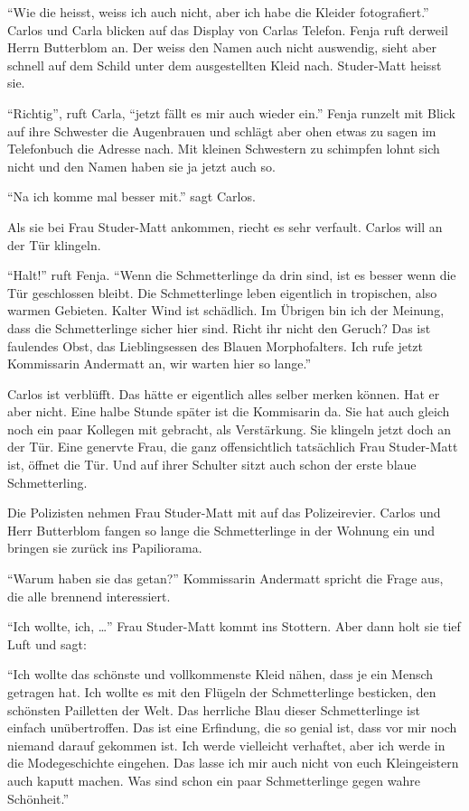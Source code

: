 \enquote{Wie die heisst, weiss ich auch nicht, aber ich habe die Kleider fotografiert.} Carlos und Carla blicken auf das Display von Carlas Telefon. Fenja ruft derweil Herrn Butterblom an. Der weiss den Namen auch nicht auswendig, sieht aber schnell auf dem Schild unter dem ausgestellten Kleid nach. Studer-Matt heisst sie.

\enquote{Richtig}, ruft Carla, \enquote{jetzt fällt es mir auch wieder ein.} Fenja runzelt mit Blick auf ihre Schwester die Augenbrauen und schlägt aber ohen etwas zu sagen im Telefonbuch die Adresse nach. Mit kleinen Schwestern zu schimpfen lohnt sich nicht und den Namen haben sie ja jetzt auch so.

\enquote{Na ich komme mal besser mit.} sagt Carlos.

Als sie bei Frau Studer-Matt ankommen, riecht es sehr verfault. Carlos will an der Tür klingeln.

\enquote{Halt!} ruft Fenja. \enquote{Wenn die Schmetterlinge da drin sind, ist es besser wenn die Tür geschlossen bleibt. Die Schmetterlinge leben eigentlich in tropischen, also warmen Gebieten. Kalter Wind ist schädlich. Im Übrigen bin ich der Meinung, dass die Schmetterlinge sicher hier sind. Richt ihr nicht den Geruch? Das ist faulendes Obst, das Lieblingsessen des Blauen Morphofalters. Ich rufe jetzt Kommissarin Andermatt an, wir warten hier so lange.}

Carlos ist verblüfft. Das hätte er eigentlich alles selber merken können. Hat er aber nicht. Eine halbe Stunde später ist die Kommisarin da. Sie hat auch gleich noch ein paar Kollegen mit gebracht, als Verstärkung. Sie klingeln jetzt doch an der Tür. Eine genervte Frau, die ganz offensichtlich tatsächlich Frau Studer-Matt ist, öffnet die Tür. Und auf ihrer Schulter sitzt auch schon der erste blaue Schmetterling.
\begin{center}
\aldineleft
\end{center}

Die Polizisten nehmen Frau Studer-Matt mit auf das Polizeirevier. Carlos und Herr Butterblom fangen so lange die Schmetterlinge in der Wohnung ein und bringen sie zurück ins Papiliorama. 

\enquote{Warum haben sie das getan?} Kommissarin Andermatt spricht die Frage aus, die alle brennend interessiert.

\enquote{Ich wollte, ich, \dots} Frau Studer-Matt kommt ins Stottern. Aber dann holt sie tief Luft und sagt: 

\enquote{Ich wollte das schönste und vollkommenste Kleid nähen, dass je ein Mensch getragen hat. Ich wollte es mit den Flügeln der Schmetterlinge besticken, den schönsten Pailletten der Welt. Das herrliche Blau dieser Schmetterlinge ist einfach unübertroffen. Das ist eine Erfindung, die so genial ist, dass vor mir noch niemand darauf gekommen ist. Ich werde vielleicht verhaftet, aber ich werde in die Modegeschichte eingehen. Das lasse ich mir auch nicht von euch Kleingeistern auch kaputt machen. Was sind schon ein paar Schmetterlinge gegen wahre Schönheit.}

